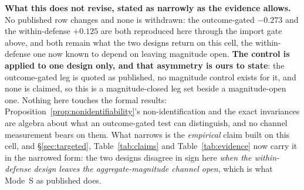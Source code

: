 \documentclass{article}
\begin{document}
\textbf{What this does not revise, stated as narrowly as the evidence allows.} No published row changes and none is withdrawn: the outcome-gated $-0.273$ and the within-defense $+0.125$ are both reproduced here through the import gate above, and both remain what the two designs return on this cell, the within-defense one now known to depend on leaving magnitude open. \textbf{The control is applied to one design only, and that asymmetry is ours to state}: the outcome-gated leg is quoted as published, no magnitude control exists for it, and none is claimed, so this is a magnitude-closed leg set beside a magnitude-open one. Nothing here touches the formal results: Proposition~\ref{prop:nonidentifiability}'s non-identification and the exact invariances are algebra about what an outcome-gated test can distinguish, and no channel measurement bears on them. What narrows is the \emph{empirical} claim built on this cell, and §\ref{sec:targeted}, Table~\ref{tab:claims} and Table~\ref{tab:evidence} now carry it in the narrowed form: the two designs disagree in sign here \emph{when the within-defense design leaves the aggregate-magnitude channel open}, which is what Mode~S as published does.
\end{document}
